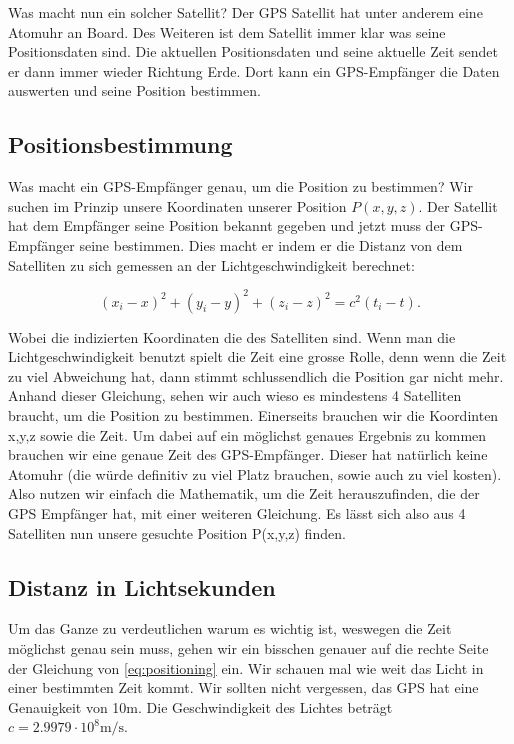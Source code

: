 \begin{refsection}
Was macht nun ein solcher Satellit? Der GPS Satellit hat unter anderem eine Atomuhr an Board. Des Weiteren ist dem Satellit immer klar was seine Positionsdaten sind. Die aktuellen Positionsdaten und seine aktuelle Zeit sendet er dann immer wieder Richtung Erde. Dort kann ein GPS-Empfänger die Daten auswerten und seine Position bestimmen.

\subsection{Positionsbestimmung}
Was macht ein GPS-Empfänger genau, um die Position zu bestimmen? Wir suchen im Prinzip unsere Koordinaten unserer Position $P(x,y,z)$. Der Satellit hat dem Empfänger seine Position bekannt gegeben und jetzt muss der GPS-Empfänger seine bestimmen. Dies macht er indem er die Distanz von dem Satelliten zu sich gemessen an der Lichtgeschwindigkeit berechnet:

\begin{equation}
\label{eq:positioning}
(x_i-x)^2 + (y_i-y)^2 + (z_i-z)^2 = c^2 (t_i -t).
\end{equation}

\noindent{}Wobei die indizierten Koordinaten die des Satelliten sind. Wenn man die Lichtgeschwindigkeit benutzt spielt die Zeit eine grosse Rolle, denn wenn die Zeit zu viel Abweichung hat, dann stimmt schlussendlich die Position gar nicht mehr. Anhand dieser Gleichung, sehen wir auch wieso es mindestens 4 Satelliten braucht, um die Position zu bestimmen. Einerseits brauchen wir die Koordinten x,y,z sowie die Zeit. Um dabei auf ein möglichst genaues Ergebnis zu kommen brauchen wir eine genaue Zeit des GPS-Empfänger. Dieser hat natürlich keine Atomuhr (die würde definitiv zu viel Platz brauchen, sowie auch zu viel kosten). Also nutzen wir einfach die Mathematik, um die Zeit herauszufinden, die der GPS Empfänger hat, mit einer weiteren Gleichung. Es lässt sich also aus 4 Satelliten nun unsere gesuchte Position P(x,y,z) finden. 

\subsection{Distanz in Lichtsekunden}
Um das Ganze zu verdeutlichen warum es wichtig ist, weswegen die Zeit möglichst genau sein muss, gehen wir ein bisschen genauer auf die rechte Seite der Gleichung von \ref{eq:positioning} ein. Wir schauen mal wie weit das Licht in einer bestimmten Zeit kommt. Wir sollten nicht vergessen, das GPS hat eine Genauigkeit von 10m. Die Geschwindigkeit des Lichtes beträgt \(c = 2.9979 \cdot 10^8 \text{m/s}\). \\


\end{refsection}
